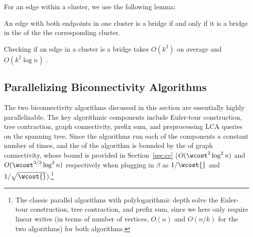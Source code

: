 For an edge within a cluster, we use the following lemma:
\begin{lemma}\label{lem:bridge-clust}
An edge with both endpoints in one cluster is a bridge if and only if it is a bridge in the \localgraph{} of the the corresponding cluster.
\end{lemma}

Checking if an edge in a cluster is a bridge takes $O(k^2)$ on average and $O(k^2\log n)$ \whp{}.
\subsection{Parallelizing Biconnectivity Algorithms}\label{sec:abstract-biconn-depth}

The two biconnectivity algorithms discussed in this section are essentially highly parallelizable.
The key algorithmic components include Euler-tour construction, tree contraction, graph connectivity, prefix sum, and preprocessing LCA queries on the spanning tree.
Since the algorithms run each of the components a constant number of times, and the \depth{} of the algorithm is bounded by the \depth{} of graph connectivity, whose bound is provided in Section~\ref{sec:cc} ($O(\wcost^2\log^2 n)$ and $O(\wcost^{3/2}\log^3 n)$ \whp{} respectively when plugging in $\beta$ as $1/\wcost{}$ and $1/\sqrt\wcost{}$).\footnote{The classic parallel algorithms with polylogarithmic depth solve the Euler-tour construction, tree contraction, and prefix sum, since we here only require linear writes (in terms of number of vertices, $O(n)$ and $O(n/k)$ for the two algorithms) for both algorithms.}

